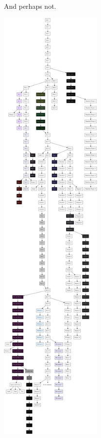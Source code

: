 \begin{paracol}{2}
\begin{leftcolumn}
  \begin{ally}
    And perhaps not.
  \end{ally}
\end{leftcolumn}
\begin{rightcolumn}
  \includegraphics[width=2in]{assets/map.png}
\end{rightcolumn}
\end{paracol}
\newpage

